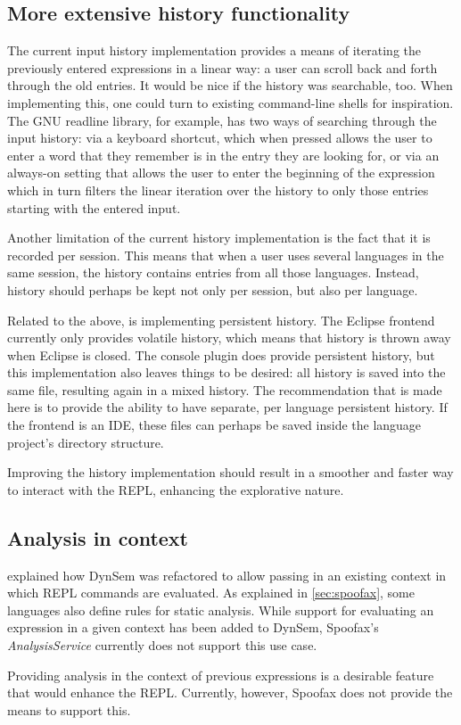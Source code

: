 \subsection{More extensive history functionality}

The current input history implementation provides a means of iterating the
previously entered expressions in a linear way: a user can scroll back and forth
through the old entries. It would be nice if the history was searchable, too.
When implementing this, one could turn to existing command-line shells for
inspiration. The GNU readline library, for example, has two ways of searching
through the input history: via a keyboard shortcut, which when pressed allows
the user to enter a word that they remember is in the entry they are looking
for, or via an always-on setting that allows the user to enter the beginning of
the expression which in turn filters the linear iteration over the
history to only those entries starting with the entered input.

Another limitation of the current history implementation is the fact that it is
recorded per session. This means that when a user uses several languages in the
same session, the history contains entries from all those languages. Instead,
history should perhaps be kept not only per session, but also per language.

Related to the above, is implementing persistent history. The Eclipse frontend
currently only provides volatile history, which means that history is thrown
away when Eclipse is closed. The console plugin does provide persistent history,
but this implementation also leaves things to be desired: all history is saved
into the same file, resulting again in a mixed history. The recommendation that
is made here is to provide the ability to have separate, per language
persistent history. If the frontend is an IDE, these files can perhaps be saved
inside the language project's directory structure.

Improving the history implementation should result in a smoother and
faster way to interact with the REPL, enhancing the explorative nature.

\subsection{Analysis in context}

 explained how DynSem was refactored to allow passing
in an existing context in which REPL commands are evaluated. As explained
in \cref{sec:spoofax}, some languages also define rules for static analysis.
While support for evaluating an expression in a given context has been added to
DynSem, Spoofax's \textit{AnalysisService} currently does not support this
use case.

Providing analysis in the context of previous expressions is a desirable
feature that would enhance the REPL. Currently, however,
Spoofax does not provide the means to support this.

